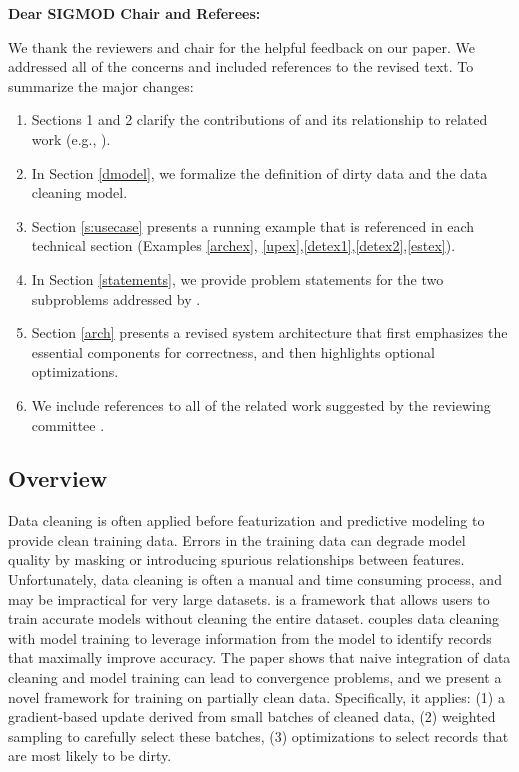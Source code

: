 {\noindent \normalsize \bf Dear SIGMOD Chair and Referees: }

\vspace{.5em}

We thank the reviewers and chair for the helpful feedback on our paper. 
We addressed all of the concerns and included references to the revised text. 
To summarize the major changes:

\begin{enumerate}
\item Sections 1 and 2 clarify the contributions of \sys and its relationship to related work (e.g., \cite{gokhale2014corleone, DBLP:journals/pvldb/YakoutENOI11, yakout2013don}).

\item In Section \ref{dmodel}, we formalize the definition of dirty data and the data cleaning model.

\item Section \ref{s:usecase} presents a running example that is referenced in each technical section (Examples \ref{archex}, \ref{upex},\ref{detex1},\ref{detex2},\ref{estex}).

\item In Section \ref{statements}, we provide problem statements for the two subproblems addressed by \sys.

\item Section \ref{arch} presents a revised system architecture that first emphasizes the essential components for correctness, and then highlights optional optimizations. 

\item We include references to all of the related work suggested by the reviewing committee \cite{whang2014incremental, papenbrock2015progressive, gruenheid2014incremental, DBLP:journals/pvldb/YakoutENOI11, yakout2013don, heise2014estimating}.
\end{enumerate}


\subsection*{Overview} 
Data cleaning is often applied before featurization and predictive modeling to provide clean training data.
Errors in the training data can degrade model quality by masking or introducing spurious relationships between features.
Unfortunately, data cleaning is often a manual and time consuming process, and may be impractical for very large datasets.
\sys is a framework that allows users to train accurate models without cleaning the entire dataset. 
\sys couples data cleaning with model training to leverage information from the model to identify records that maximally improve accuracy.
The paper shows that naive integration of data cleaning and model training can lead to convergence problems, and we present a novel framework for training on partially clean data.
Specifically, it applies: (1) a gradient-based update derived from small batches of cleaned data, (2) weighted sampling to carefully select these batches, (3) optimizations to select records that are most likely to be dirty.

